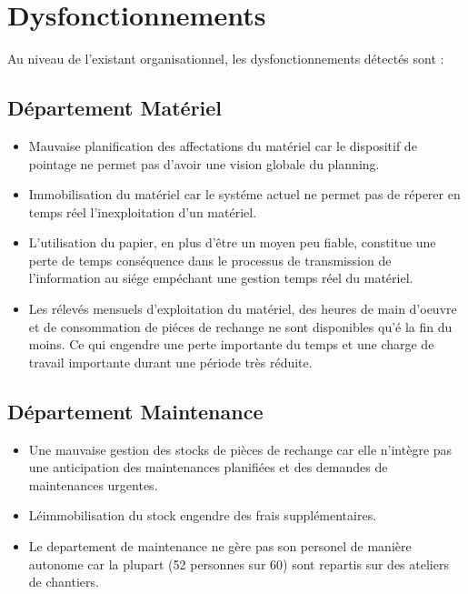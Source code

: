 		
		
\section{Dysfonctionnements}	
		
		Au niveau de l'existant organisationnel, les dysfonctionnements détectés sont :
		
		\subsection{Département Matériel}
				\begin{itemize}
						\item Mauvaise planification des affectations du matériel car le dispositif de pointage ne permet pas d'avoir une vision globale du planning.
						\item Immobilisation du matériel car le systéme actuel ne permet pas de réperer en temps réel l'inexploitation d'un matériel.
						\item L'utilisation du papier, en plus d'être un moyen peu fiable, constitue une perte de temps conséquence dans le processus de transmission de l'information au siége empéchant une gestion temps réel du matériel.
						\item Les rélevés mensuels d'exploitation du matériel, des heures de main d'oeuvre et de consommation de piéces de rechange ne sont disponibles qu'é la fin du moins. Ce qui engendre une perte importante du temps et une charge de travail importante durant une période très réduite.
				\end{itemize}
		
		\subsection{Département Maintenance}
				\begin{itemize}
						\item Une mauvaise gestion des stocks de pièces de rechange car elle n'intègre pas une anticipation des maintenances planifiées et des demandes de maintenances urgentes.
						\item Léimmobilisation du stock engendre des frais supplémentaires.
						\item Le departement de maintenance ne gère pas son personel de manière autonome car la plupart (52 personnes sur 60) sont repartis sur des ateliers de chantiers.
				\end{itemize}
		
